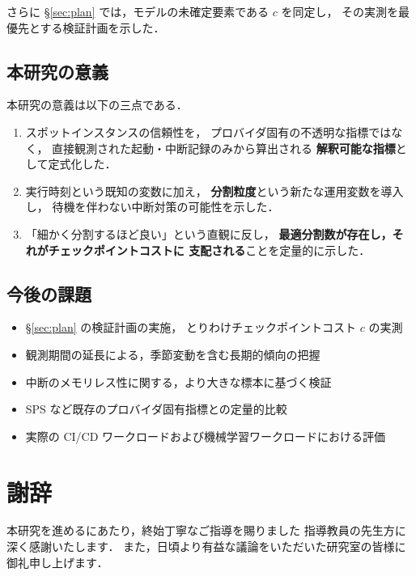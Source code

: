 \documentclass[11pt,a4paper]{ltjsreport}
\begin{document}
さらに \S\ref{sec:plan} では，モデルの未確定要素である $c$ を同定し，
その実測を最優先とする検証計画を示した．

\section{本研究の意義}

本研究の意義は以下の三点である．

\begin{enumerate}
  \item スポットインスタンスの信頼性を，
        プロバイダ固有の不透明な指標ではなく，
        直接観測された起動・中断記録のみから算出される
        \textbf{解釈可能な指標}として定式化した．
  \item 実行時刻という既知の変数に加え，
        \textbf{分割粒度}という新たな運用変数を導入し，
        待機を伴わない中断対策の可能性を示した．
  \item 「細かく分割するほど良い」という直観に反し，
        \textbf{最適分割数が存在し，それがチェックポイントコストに
        支配される}ことを定量的に示した．
\end{enumerate}

\section{今後の課題}

\begin{itemize}
  \item \S\ref{sec:plan} の検証計画の実施，
        とりわけチェックポイントコスト $c$ の実測
  \item 観測期間の延長による，季節変動を含む長期的傾向の把握
  \item 中断のメモリレス性に関する，より大きな標本に基づく検証
  \item SPS など既存のプロバイダ固有指標との定量的比較
  \item 実際の CI/CD ワークロードおよび機械学習ワークロードにおける評価
\end{itemize}

\chapter*{謝辞}

本研究を進めるにあたり，終始丁寧なご指導を賜りました
指導教員の先生方に深く感謝いたします．
また，日頃より有益な議論をいただいた研究室の皆様に御礼申し上げます．
\end{document}
